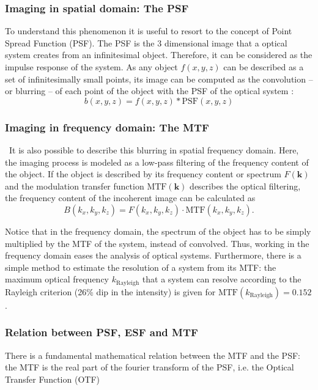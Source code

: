 \subsubsection{Imaging in spatial domain: The PSF}
To understand this phenomenon it is useful to resort to the concept of Point Spread Function (PSF). The PSF is the 3 dimensional image that a optical system creates from an infinitesimal object. Therefore, it can be considered as the impulse response of the system. As any object $f(x,y,z)$ can be described as a set of infinitesimally small points, its image can be computed as the convolution -- or blurring -- of each point of the object with the PSF of the optical system \cite{Boreman2001}:
\begin{equation}
b(x,y,z) = f(x,y,z)\ast \textrm{PSF}(x,y,z)
\label{eq:imaging}
\end{equation}

\subsubsection{Imaging in frequency domain: The MTF}
\
It is also possible to describe this blurring in spatial frequency domain. Here, the imaging process is modeled as a low-pass filtering of the frequency content of the object. If the object is described by its frequency content or spectrum $F(\bm{k})$ and the modulation transfer function $\textrm{MTF}(\bm{k})$ describes the optical filtering, the frequency content of the incoherent image can be calculated as
\begin{equation}
B(k_x,k_y,k_z) = F(k_x,k_y,k_z) \cdot \textrm{MTF}(k_{x},k_{y},k_{z}).
\end{equation}

Notice that in the frequency domain, the spectrum of the object has to be simply multiplied by the MTF of the system, instead of convolved. Thus, working in the frequency domain eases the analysis of optical systems. Furthermore, there is a simple method to estimate the resolution of a system from its MTF: the maximum optical frequency $k_\textrm{Rayleigh}$ that a system can resolve according to the Rayleigh criterion (26\% dip in the intensity) is given for $\textrm{MTF}(k_\textrm{Rayleigh})=0.152$ \cite{Kretschmer}.

\subsubsection{Relation between PSF, ESF and MTF}
\label{ssec:PSFMTF}
There is a fundamental mathematical relation between the MTF and the PSF: the MTF is the real part of the fourier transform of the PSF, i.e. the Optical Transfer Function (OTF) \cite{Boreman2001}

